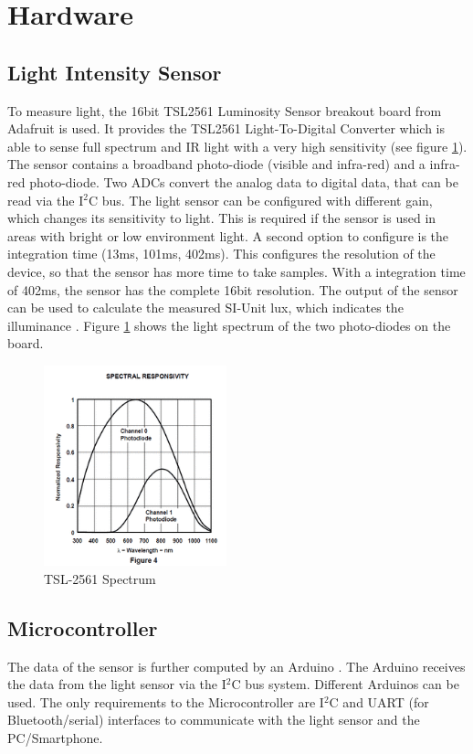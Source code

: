 \documentclass[notitlepage]{scrreprt}
\begin{document}
\section{Hardware}
\subsection{Light Intensity Sensor}
To measure light, the 16bit TSL2561 Luminosity Sensor breakout board from Adafruit is used. It provides the TSL2561 Light-To-Digital Converter which is able to sense full spectrum and IR light with a very high sensitivity (see figure \ref{fig:tsl-2561-spectrum}). The sensor contains a broadband photo-diode (visible and infra-red) and a infra-red photo-diode. Two ADCs convert the analog data to digital data, that can be read via the I$^{2}$C bus. The light sensor can be configured with different gain, which changes its sensitivity to light. This is required if the sensor is used in areas with bright or low environment light. A second option to configure is the integration time (13ms, 101ms, 402ms). This configures the resolution of the device, so that the sensor has more time to take samples. With a integration time of 402ms, the sensor has the complete 16bit resolution. The output of the sensor can be used to calculate the measured SI-Unit lux, which indicates the illuminance \cite{bib:tsl-sensor}. Figure \ref{fig:tsl-2561-spectrum} shows the light spectrum of the two photo-diodes on the board.

\begin{figure}[H]
	\centering
	\includegraphics[width=200px]{images/light_tsl2561spectrum.png}
	\caption{TSL-2561 Spectrum}
	\label{fig:tsl-2561-spectrum}
\end{figure}

\subsection{Microcontroller}
The data of the sensor is further computed by an Arduino \cite{bib:arduino-board}. The Arduino receives the data from the light sensor via the I$^{2}$C bus system. Different Arduinos can be used. The only requirements to the Microcontroller are I$^{2}$C and UART (for Bluetooth/serial) interfaces to communicate with the light sensor and the PC/Smartphone.
\end{document}

